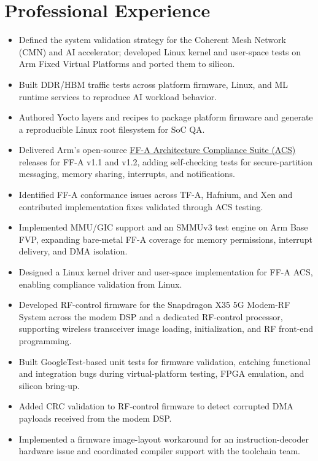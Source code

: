 \section*{Professional Experience}

\begin{itemize}
  \item Defined the system validation strategy for the Coherent Mesh Network (CMN) and AI accelerator; developed Linux kernel and user-space tests on Arm Fixed Virtual Platforms and ported them to silicon.
  \item Built DDR/HBM traffic tests across platform firmware, Linux, and ML runtime services to reproduce AI workload behavior.
  \item Authored Yocto layers and recipes to package platform firmware and generate a reproducible Linux root filesystem for SoC QA.
\end{itemize}

\begin{itemize}
  \item Delivered Arm's open-source \href{https://github.com/ARM-software/ff-a-acs}{FF-A Architecture Compliance Suite (ACS)} releases for FF-A v1.1 and v1.2, adding self-checking tests for secure-partition messaging, memory sharing, interrupts, and notifications.
  \item Identified FF-A conformance issues across TF-A, Hafnium, and Xen and contributed implementation fixes validated through ACS testing.
  \item Implemented MMU/GIC support and an SMMUv3 test engine on Arm Base FVP, expanding bare-metal FF-A coverage for memory permissions, interrupt delivery, and DMA isolation.
  \item Designed a Linux kernel driver and user-space implementation for FF-A ACS, enabling compliance validation from Linux.
\end{itemize}

\begin{itemize}
  \item Developed RF-control firmware for the Snapdragon X35 5G Modem-RF System across the modem DSP and a dedicated RF-control processor, supporting wireless transceiver image loading, initialization, and RF front-end programming.
  \item Built GoogleTest-based unit tests for firmware validation, catching functional and integration bugs during virtual-platform testing, FPGA emulation, and silicon bring-up.
  \item Added CRC validation to RF-control firmware to detect corrupted DMA payloads received from the modem DSP.
  \item Implemented a firmware image-layout workaround for an instruction-decoder hardware issue and coordinated compiler support with the toolchain team.
\end{itemize}


